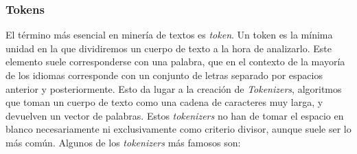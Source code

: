 \subsubsection{Tokens}
\label{sec:tokens}
El término más esencial en minería de textos es \textit{token}. Un token es la mínima unidad en la que dividiremos un cuerpo de texto a la hora de analizarlo. Este elemento suele corresponderse con una palabra, que en el contexto de la mayoría de los idiomas corresponde con un conjunto de letras separado por espacios anterior y posteriormente. Esto da lugar a la creación de \textit{Tokenizers}, algoritmos que toman un cuerpo de texto como una cadena de caracteres muy larga, y devuelven un vector de palabras. Estos \textit{tokenizers } no han de tomar el espacio en blanco necesariamente ni exclusivamente como criterio divisor, aunque suele ser lo más común. Algunos de los \textit{tokenizers} más famosos son:

